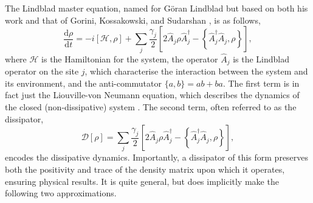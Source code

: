 The Lindblad master equation, named for G\"{o}ran Lindblad but based on both his work and that of Gorini, Kossakowski, and Sudarshan \cite{Lindblad76,GKS76}, is as follows,
\begin{equation}
	\frac{\mathrm{d}\rho}{\mathrm{d}t} = -i [\mathcal{H}, \rho] + \sum_{j} \frac{\gamma_{j}}{2} \left[ 2\hat{A}_{j} \rho \hat{A}_{j}^{\dagger} - \left\{\hat{A}_{j}^{\dagger}\hat{A}_{j}, \rho\right\}\right],
	\label{eq:oqs3-1}
\end{equation}
where \(\mathcal{H}\) is the Hamiltonian for the system, the operator \(\hat{A}_{j}\) is the Lindblad operator on the site \(j\), which characterise the interaction between the system and its environment, and the anti-commutator \(\{a, b\} = ab + ba\). The first term is in fact just the Liouville-von Neumann equation, which describes the dynamics of the closed (non-dissipative) system \cite{BP_LvN}. The second term, often referred to as the dissipator,
\begin{equation}
	\mathcal{D}[\rho] = \sum_{j}\frac{\gamma_{j}}{2}\left[2\hat{A}_{j}\rho\hat{A}_{j}^{\dagger} - \left\{\hat{A}_{j}^{\dagger}\hat{A}_{j}, \rho\right\}\right],
	\label{eq:oqs3-2}
\end{equation}
encodes the dissipative dynamics. Importantly, a dissipator of this form preserves both the positivity and trace of the density matrix upon which it operates, ensuring physical results. It is quite general, but does implicitly make the following two approximations.

